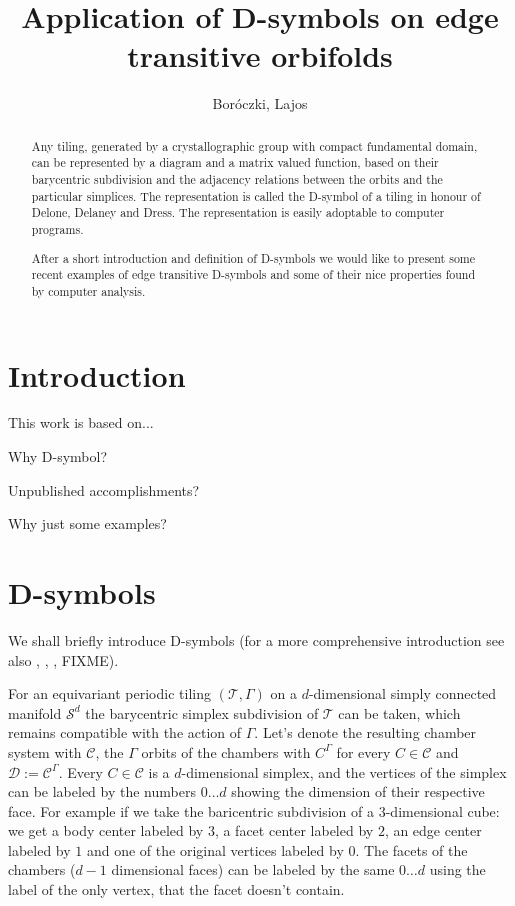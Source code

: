 \documentclass[12pt,a4paper]{article}
\begin{document}
\title{Application of D-symbols on edge transitive orbifolds}
\author{Boróczki, Lajos}
\maketitle

\begin{abstract}
  Any tiling, generated by a crystallographic group with compact fundamental
  domain, can be represented by a diagram and a matrix valued function, based on
  their barycentric subdivision and the adjacency relations between the orbits
  and the particular simplices. The representation is called the D-symbol of a
  tiling in honour of Delone, Delaney and Dress. The representation is easily
  adoptable to computer programs.

  After a short introduction and definition of D-symbols we would like to
  present some recent examples of edge transitive D-symbols and some of their
  nice properties found by computer analysis.
\end{abstract}

\section{Introduction}
This work is based on...

Why D-symbol?

Unpublished accomplishments?

Why just some examples?

\section{D-symbols}
We shall briefly introduce D-symbols (for a more comprehensive introduction see
also \cite{BSzK02}, \cite{DHM93}, \cite{M96}, FIXME). 

For an equivariant periodic tiling $(\mathcal{T},\Gamma)$ on a $d$-dimensional simply
connected manifold $\mathcal{S}^d$ the barycentric simplex subdivision of $\mathcal{T}$
can be taken, which remains compatible with the action of $\Gamma$. Let's denote
the resulting chamber system with $\mathcal{C}$, the $\Gamma$ orbits of the
chambers with $C^\Gamma$ for every $C\in \mathcal{C}$ and $\mathcal{D}:=
\mathcal{C}^\Gamma$. Every $C\in \mathcal{C}$
is a $d$-dimensional simplex, and the vertices of the simplex can be labeled by
the numbers $0\ldots d$ showing the dimension of their respective face. For
example if we take the baricentric subdivision of a $3$-dimensional cube: we get
a body center labeled by $3$, a facet center labeled by $2$, an edge center
labeled by $1$ and one of the original vertices labeled by $0$. The facets
of the chambers ($d-1$ dimensional faces) can be labeled by the same $0\ldots d$
using the label of the only vertex, that the facet doesn't contain.
\end{document}
